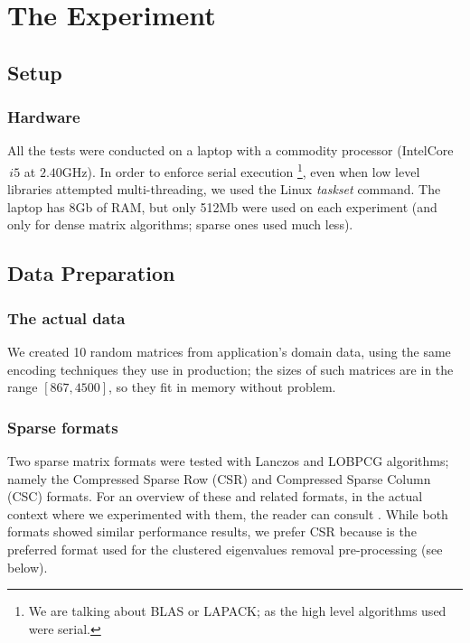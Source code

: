 \chapter{The Experiment}

\section{Setup}

\subsection{Hardware}

All the tests were conducted on a laptop with a commodity processor
(Intel\textregistered Core\texttrademark $\,i5$ at $2.40$GHz). In
order to enforce serial execution \footnote{We are talking about BLAS
  or LAPACK; as the high level algorithms used were serial.}, even
when low level libraries attempted multi-threading, we used the Linux
\emph{taskset} command. The laptop has $8$Gb of RAM, but only 512Mb
were used on each experiment (and only for dense matrix algorithms;
sparse ones used much less). \\

\section{Data Preparation}

\subsection{The actual data}
We created 10 random matrices from application's domain data, using
the same encoding techniques they use in production; the sizes of such
matrices are in the range $[867,4500]$, so they fit in memory without
problem. \\

\subsection{Sparse formats}
Two sparse matrix formats were tested with Lanczos and LOBPCG
algorithms; namely the Compressed Sparse Row (CSR) and Compressed
Sparse Column (CSC) formats. For an overview of these and related
formats, in the actual context where we experimented with them, the
reader can consult \cite{johansson15}. While both formats showed
similar performance results, we prefer CSR because is the preferred
format used for the clustered eigenvalues removal pre-processing (see
below). 

